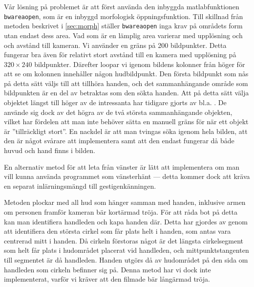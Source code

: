 Vår lösning på problemet är att först använda den inbyggda
matlabfunktionen \texttt{bwareaopen}, som är en inbyggd morfologisk
öppningsfunktion. Till skillnad från metoden beskrivet i
\ref{sec:morph} ställer \texttt{bwareaopen} inga
krav på områdets form utan endast dess area. Vad som är en lämplig area
varierar med upplösning och
och avstånd till kameran. Vi använder en gräns på 200
bildpunkter. Detta fungerar bra även för relativt stort avstånd till
 en kamera med upplösning på $320\times240$ bildpunkter. Därefter loopar vi
igenom bildens kolonner från
höger för att se om kolonnen innehåller någon hudbildpunkt. Den första
bildpunkt som nås på detta sätt väljs till att tillhöra handen, och det
sammanhängande område som bildpunkten är en del av betraktas som den sökta
handen. Att på detta sätt välja objektet längst till höger av de
intressanta har tidigare gjorts av bl.a. . De använde
sig dock av det högra av de två största sammanhängande objekten,
vilket har fördelen att man inte behöver sätta en manuell gräns för
när ett objekt är ''tillräckligt stort''. En nackdel är att man tvingas
söka igenom hela bilden, att den är något svårare att
implementera samt att den endast fungerar då både huvud och hand finns
i bilden.

En alternativ metod för att leta från
vänster är lätt att implementera om man vill kunna använda programmet
som vänsterhänt --- detta kommer dock att kräva en
separat inlärningsmängd till gestigenkänningen.

Metoden plockar med all hud som hänger samman med
handen, inklusive armen om personen framför kameran bär kortärmad tröja. För att
råda bot på detta kan man identifiera handleden och kapa handen
där. Detta har gjordes av  genom att identifiera den största cirkel
som får plats helt i handen, som antas vara centrerad mitt i handen. Då
cirkeln förstoras något är det längsta cirkelsegment som helt får
plats i hudområdet placerat vid handleden, och mittpunktstangenten
till segmentet är då handleden. Handen utgörs då av hudområdet på den
sida om handleden som cirkeln befinner sig på. Denna metod har vi dock
inte implementerat, varför vi kräver att den filmade bär
långärmad tröja. 
